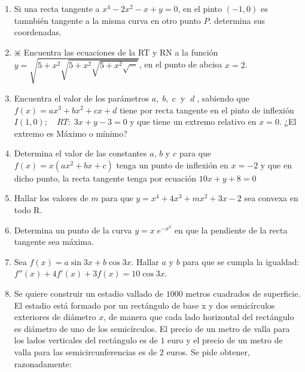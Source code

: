 \begin{enumerate}
\rightline{\textcolor{gris}{Solución: $a=-1; \; b=3$}} 

\item Si una recta tangente a $x^4-2x^2-x+y=0$, en el pinto $(-1,0)$ es tamnbién tangente a la misma curva en otro punto $P$. determina sus coordenadas.

\rightline{\textcolor{gris}{Solución: $P(1,2)$}}

\item $\divideontimes$ Encuentra las ecuaciones de la RT y RN a la función $y=\sqrt{5+x^2\sqrt{5+x^2\sqrt{5+x^2\sqrt{\cdots}}}}$, en el punto de abcisa $x=2$.

\rightline{\textcolor{gris}{Solución: $RT:\; 10x-3y-5=0; \quad RN\; 3x+10y-56=0$}}

\item Encuentra el valor de los parámetros $a,\; b,\; c\; $ y $\; d\; $, sabiendo que $f(x)=ax^3+bx^2+cx+d$ tiene por recta tangente en el pinto de inflexión $I(1,0); \quad RT:\; 3x+y-3=0$ y que tiene un extremo relativo en $x=0$. ¿El extremo es Máximo o mínimo?

\rightline{\textcolor{gris}{Solución: $a=3;\;b=-9;\;c=6;\;d=0$}}

\item Determina el valor de las constantes $a$, $b$ y $c$ para que $f(x)=x(ax^2+bx+c)$ tenga un punto de inflexión en $x=-2$ y que en dicho punto, la recta tangente tenga por ecuación $10x+y+8=0$ 

\rightline{\textcolor{gris}{Solución: $a=1; \; b=6; \; c=2$}}

\item Hallar los valores de $m$ para que $y=x^4+4x^3+mx^2+3x-2$ sea convexa en todo $\mathrm{R}$.

\rightline{\textcolor{gris}{Solución: $m\ge6$}}

\item Determina un punto de la curva $y=x\; e^{-x^2}$ en que la pendiente de la recta tangente sea máxima.

\rightline{\textcolor{gris}{Solución: $x=0$}}

\item Sea $f(x)=a\sin 3x +b\cos 3x$. Hallar $a$ y $b$ para que se cumpla la igualdad: $f''(x)+4f'(x)+3f(x)=10\cos 3x$.

\rightline{\textcolor{gris}{Solución: $a=2/3; \; b=-1/3$}}

\item 	Se quiere construir un estadio vallado de $1000$ metros 
cuadrados de superficie. El estadio está formado por un 
rectángulo de base x y dos semicírculos exteriores de 
diámetro $x$, de manera que cada lado horizontal del 
rectángulo es diámetro de uno de los semicírculos. El 
precio de un metro de valla para los lados verticales del 
rectángulo es de $1$ euro y el precio de un metro de valla 
para las semicircunferencias es de $2$ euros. Se pide obtener, 
razonadamente: 


\end{enumerate}

